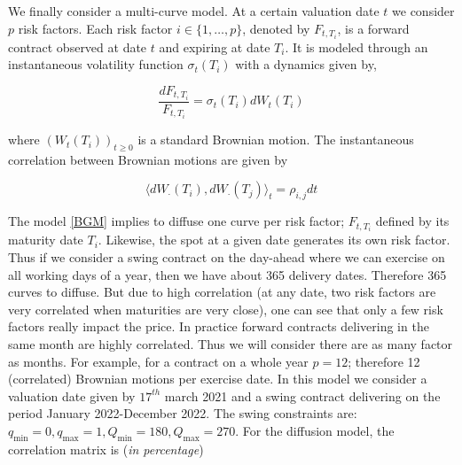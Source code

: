\documentclass{article}
\numberwithin{equation}{section}
\begin{document}
\indent


We finally consider a multi-curve model. At a certain valuation date $t$ we consider $p$ risk factors. Each risk factor $i \in \{1,\ldots,p\}$, denoted by $F_{t, T_i}$, is a forward contract observed at date $t$ and expiring at date $T_i$. It is modeled through an instantaneous volatility function $\sigma_t(T_i)$ with a dynamics given by,

\begin{equation}
\label{BGM}
\frac{dF_{t, T_i}}{F_{t, T_i}} = \sigma_t(T_i) dW_t(T_i)
\end{equation}


\noindent
where $(W_t(T_i))_{t \ge 0}$ is a standard Brownian motion. The instantaneous correlation between Brownian motions are given by

$$\langle dW_{\cdot}(T_i), dW_{\cdot}(T_j) \rangle_t = \rho_{i, j} dt$$

The model \eqref{BGM} implies to diffuse one curve per risk factor; $F_{t, T_i}$ defined by its maturity date $T_i$. Likewise, the spot at a given date generates its own risk factor. Thus if we consider a swing contract on the day-ahead where we can exercise on all working days of a year, then we have about 365 delivery dates. Therefore 365 curves to diffuse. But due to high correlation (at any date, two risk factors are very correlated when maturities are very close), one can see that only a few risk factors really impact the price. In practice forward contracts delivering in the same month are highly correlated. Thus we will consider there are as many factor as months. For example, for a contract on a whole year $p = 12$; therefore 12 (correlated) Brownian motions per exercise date. In this model we consider a valuation date given by $17^{th}$ march 2021 and a swing contract delivering on the period January 2022-December 2022. The swing constraints are: $q_{\min} = 0, q_{\max} = 1, Q_{\min} = 180, Q_{\max} = 270$. For the diffusion model, the correlation matrix is (\textit{in percentage})

\setcounter{MaxMatrixCols}{20}
\end{document}
